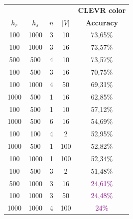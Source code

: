 \begin{table}[ht]
    \centering
    \begin{tabular}{cccc|c}
        \toprule
                                      &           &     &       & \multicolumn{1}{c}{\textbf{CLEVR color}} \\  \cmidrule(lr){5-5}
        $h_r$                         & $h_s$     & $n$ & $|V|$ & \textbf{Accuracy}                        \\\midrule
        {100}                         & {1000}    & {3} & {10}  & {73,65\%}                                \\
        {100}                         & {1000}    & {3} & {16}  & {73,57\%}                                \\
        {500}                         & {500}     & {4} & {10}  & {73,57\%}                                \\
        {100}                         & {500}     & {3} & {16}  & {70,75\%}                                \\
        {100}                         & {1000}    & {4} & {50}  & {69,31\%}                                \\
        {1000}                        & {500}     & {1} & {16}  & {62,85\%}                                \\
        {100}                         & {500}     & {1} & {10}  & {57,12\%}                                \\
        {1000}                        & {500}     & {6} & {16}  & {54,69\%}                                \\
        {100}                         & {100}     & {4} & {2}   & {52,95\%}                                \\
        {1000}                        & {500}     & {1} & {100} & {52,82\%}                                \\
        {100}                         & {1000}    & {1} & {100} & {52,34\%}                                \\
        {100}                         & {500}     & {3} & {2}   & {51,48\%}                                \\
        {500}                         & {1000}    & {3} & {16}  & \textcolor{purple}{24,61\%}              \\
        {100}                         & {1000}    & {3} & {50}  & \textcolor{purple}{24,48\%}              \\
        {1000}                        & {1000}    & {4} & {100} & \textcolor{purple}{24\%}                 \\

\end{tabular}
\end{table}
